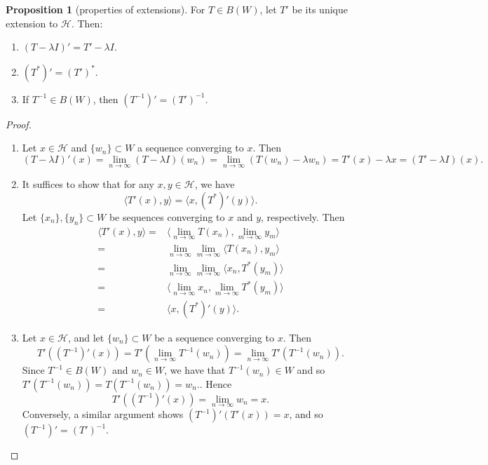 \documentclass{dcthesis}
\numberwithin{equation}{section}
\numberwithin{equation}{section}
\theoremstyle{definition}
\newtheorem{proposition}[equation]{Proposition}
\begin{document}
\begin{proposition}[properties of extensions]
\label{prop_extension_properties}
	For $T\in B(W)$, let $T'$ be its unique extension to $\mathcal{H}$. Then:
	\begin{enumerate}
		\item $(T-\lambda I)' = T' - \lambda I$.
		\item $(T^\ast)' = (T')^\ast$.
		\item If $T^{-1}\in B(W)$, then $(T^{-1})' = (T')^{-1}$.
	\end{enumerate}
\end{proposition}
\begin{proof}
	\hfill
	\begin{enumerate}
		\item Let $x\in\mathcal{H}$ and $\{w_n\}\subset W$ a sequence converging to $x$. Then 
			\begin{equation*}
				(T-\lambda I)'(x) = \lim_{n\to\infty} (T-\lambda I)(w_n) = \lim_{n\to\infty} (T(w_n) - \lambda w_n) = T'(x) - \lambda x = (T'-\lambda I)(x).
			\end{equation*}
		\item It suffices to show that for any $x,y\in\mathcal{H}$, we have
			\begin{equation*}
				\langle T'(x), y \rangle = \langle x, (T^\ast)'(y) \rangle.
			\end{equation*}
			Let $\{x_n\}, \{y_n\}\subset W$ be sequences converging to $x$ and $y$, respectively. Then 
			\begin{align*}
				\langle T'(x), y \rangle =& \langle \lim_{n\to\infty}T(x_n), \lim_{m\to\infty}y_m \rangle \\
				=& \lim_{n\to\infty} \lim_{m\to\infty} \langle T(x_n), y_m \rangle \\
				=& \lim_{n\to\infty} \lim_{m\to\infty} \langle x_n, T^\ast(y_m) \rangle \\
				=& \langle \lim_{n\to\infty} x_n, \lim_{m\to\infty} T^\ast(y_m) \rangle \\
				=& \langle x, (T^\ast)'(y) \rangle.
			\end{align*}
		\item Let $x\in \mathcal{H}$, and let $\{w_n\}\subset W$ be a sequence converging to $x$. Then 
			\begin{equation*}
				T'((T^{-1})'(x))=T'(\lim_{n\to\infty}T^{-1}(w_n))=\lim_{n\to\infty} T'(T^{-1}(w_n)).
			\end{equation*}
			Since $T^{-1}\in B(W)$ and $w_n\in W$, we have that $T^{-1}(w_n)\in W$ and so $T'(T^{-1}(w_n))=T(T^{-1}(w_n))= w_n.$. Hence 
			\begin{equation*}
				T'((T^{-1})'(x)) = \lim_{n\to\infty} w_n = x.
			\end{equation*}
			Conversely, a similar argument shows $(T^{-1})'(T'(x)) = x$, and so $(T^{-1})' = (T')^{-1}$.
	\end{enumerate}
\end{proof}
\end{document}
